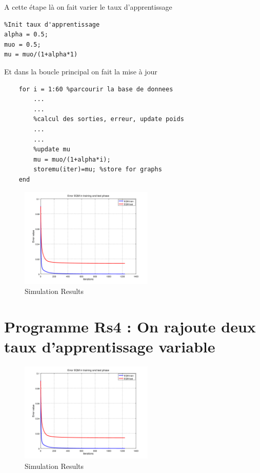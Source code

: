 \documentclass[journal]{IEEEtran}
\begin{document}
A cette étape là on fait varier le taux d'apprentissage
%
%

\begin{lstlisting}
%Init taux d'apprentissage
alpha = 0.5;
muo = 0.5;
mu = muo/(1+alpha*1)
\end{lstlisting}
Et dans la boucle principal on fait la mise à jour
\begin{lstlisting}
    for i = 1:60 %parcourir la base de donnees
	    ...
	    ...
	    %calcul des sorties, erreur, update poids
	    ...
	    ...
		%update mu
		mu = muo/(1+alpha*i);
		storemu(iter)=mu; %store for graphs
	end
\end{lstlisting}
\blindtext
\begin{figure}[h]
	\centering
	\includegraphics[width=2.5in]{../OctaveNeurons/rs31}
	\caption{Simulation Results}
	\label{fig_sim}
\end{figure}
\blindtext


\section{Programme Rs4 : On rajoute deux taux d'apprentissage variable}\blindtext
%
%
\begin{figure}[h]
	\centering
	\includegraphics[width=2.5in]{../OctaveNeurons/rs31}
	\caption{Simulation Results}
	\label{fig_sim}
\end{figure}
\blindtext
\end{document}
